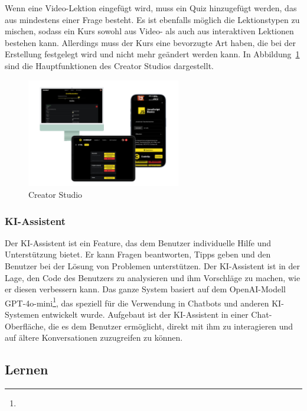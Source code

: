 \documentclass[main.tex]{subfiles}
\begin{document}
    Wenn eine Video-Lektion eingefügt wird, muss ein Quiz hinzugefügt werden, das aus mindestens einer Frage besteht.
    Es ist ebenfalls möglich die Lektionstypen zu mischen, sodass ein Kurs sowohl aus Video- als auch aus interaktiven Lektionen bestehen kann.
    Allerdings muss der Kurs eine bevorzugte Art haben, die bei der Erstellung festgelegt wird und nicht mehr geändert werden kann.
    In Abbildung~\ref{fig:creator-studio} sind die Hauptfunktionen des Creator Studios dargestellt.
    \begin{figure}[h] %
        \centering
        \includegraphics[width=0.6\textwidth]{assets/creator-studio}
        \caption{Creator Studio}
        \label{fig:creator-studio}
    \end{figure}
    \subsubsection{KI-Assistent}
    Der KI-Assistent ist ein Feature, das dem Benutzer individuelle Hilfe und Unterstützung bietet.
    Er kann Fragen beantworten, Tipps geben und den Benutzer bei der Lösung von Problemen unterstützen.
    Der KI-Assistent ist in der Lage, den Code des Benutzers zu analysieren und ihm Vorschläge zu machen, wie er diesen verbessern kann.
    Das ganze System basiert auf dem OpenAI-Modell GPT-4o-mini\footnote{}, das speziell für die Verwendung in Chatbots und anderen KI-Systemen entwickelt wurde.
    Aufgebaut ist der KI-Assistent in einer Chat-Oberfläche, die es dem Benutzer ermöglicht, direkt mit ihm zu interagieren und auf ältere Konversationen zuzugreifen zu können.
    \subsection{Lernen}
\end{document}
